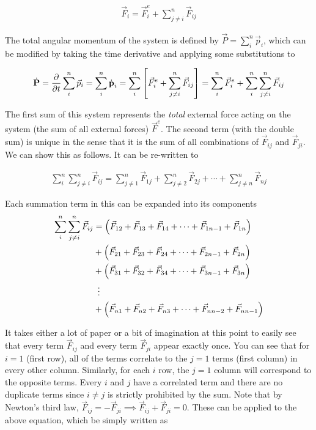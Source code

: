 \begin{align}
\vec{F}_i = \vec{F}_i^e + \sum_{j\neq i}^{n} \vec{F}_{ij}
\end{align}

The total angular momentum of the system is defined by $\vec{P} = \sum_{i}^{n} \vec{p}_i$, which can be modified by taking the time derivative and applying some substitutions to

\begin{align}
\dot{\text{\textbf{P}}} = \frac{\partial}{\partial t}\sum_{i}^{n} \vec{p}_i = \sum_{i}^{n} \dot{\text{\textbf{p}}}_i = \sum_{i}^{n} \left[\vec{F}_i^e + \sum_{j\neq i}^{n} \vec{F}_{ij}\right] = \sum_{i}^{n} \vec{F}_i^e + \sum_{i}^{n}\sum_{j\neq i}^{n} \vec{F}_{ij} \label{angular momentum derivation 1}
\end{align}

The first sum of this system represents the \textit{total} external force acting on the system (the sum of all external forces) $\vec{F}^e$. The second term (with the double sum) is unique in the sense that it is the sum of all combinations of $\vec{F}_{ij}$ and $\vec{F}_{ji}$. We can show this as follows. It can be re-written to

\begin{align}
\sum_{i}^{n}\sum_{j\neq i}^{n} \vec{F}_{ij} = \sum_{j\neq 1}^{n} \vec{F}_{1j} + \sum_{j\neq 2}^{n} \vec{F}_{2j} + \cdots + \sum_{j\neq n}^{n} \vec{F}_{nj}
\end{align}

Each summation term in this can be expanded into its components
\begin{align}
\sum_{i}^{n}\sum_{j\neq i}^{n} \vec{F}_{ij} &= \left(\vec{F}_{12} + \vec{F}_{13} + \vec{F}_{14} +\cdots + \vec{F}_{1n-1} +\vec{F}_{1n}\right) \\ &+ \left(\vec{F}_{21} + \vec{F}_{23} + \vec{F}_{24} +\cdots + \vec{F}_{2n-1} +\vec{F}_{2n}\right)\\ &+ \left(\vec{F}_{31} + \vec{F}_{32} + \vec{F}_{34} +\cdots + \vec{F}_{3n-1} +\vec{F}_{3n}\right)\\ &\hspace{0.5em}\vdots \\ &+ \left(\vec{F}_{n1} + \vec{F}_{n2} + \vec{F}_{n3} +\cdots + \vec{F}_{nn-2} + \vec{F}_{nn-1}\right) 
\end{align}

It takes either a lot of paper or a bit of imagination at this point to easily see that every term $\vec{F}_{ij}$ and every term $\vec{F}_{ji}$ appear exactly once. You can see that for $i=1$ (first row), all of the terms correlate to the $j=1$ terms (first column) in every other column. Similarly, for each $i$ row, the $j=1$ column will correspond to the opposite terms. Every $i$ and $j$ have a correlated term and there are no duplicate terms since $i\neq j$ is strictly prohibited by the sum. Note that by Newton's third law, $\vec{F}_{ij} = -\vec{F}_{ji} \implies \vec{F}_{ij} + \vec{F}_{ji} = 0$. These can be applied to the above equation, which be simply written as

